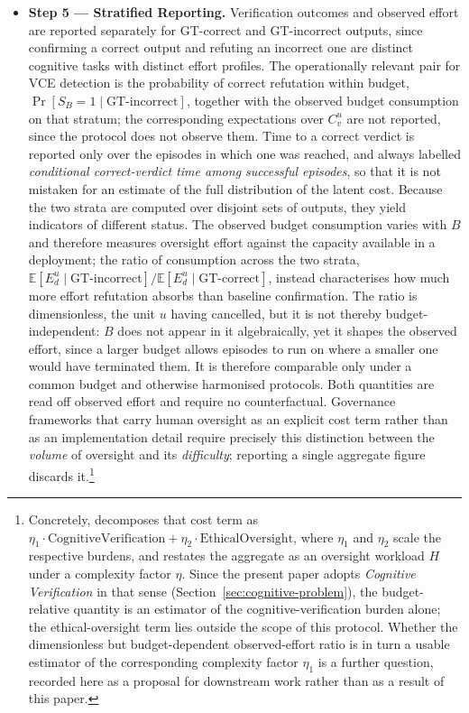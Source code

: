 \documentclass[11pt]{article}
\newcommand{\bridge}[1]{\textcolor[HTML]{ED7D31}{#1}}
\newcommand{\viola}[1]{\textcolor[HTML]{7030A0}{#1}}
\newcommand{\bridge}[1]{#1}
\newcommand{\viola}[1]{#1}
\begin{document}
\begin{itemize}
    \item \textbf{Step 5 --- Stratified Reporting.} \viola{Verification outcomes and observed effort are reported separately for GT-correct and GT-incorrect outputs, since confirming a correct output and refuting an incorrect one are distinct cognitive tasks with distinct effort profiles.} \viola{The operationally relevant pair for VCE detection is the probability of correct refutation within budget, \mbox{$\Pr[S_B=1 \mid \text{GT-incorrect}]$}, together with the observed budget consumption on that stratum; the corresponding expectations over \mbox{$C_v^{u}$} are not reported, since the protocol does not observe them. \viola{Time to a correct verdict is reported only over the episodes in which one was reached, and always labelled \emph{conditional correct-verdict time among successful episodes}, so that it is not mistaken for an estimate of the full distribution of the latent cost.}}
    \bridge{Because the two strata are computed over disjoint sets of outputs, they yield indicators of different status.} \viola{The observed budget consumption varies with $B$ and therefore measures oversight effort against the capacity available in a deployment; the ratio of consumption across the two strata, \mbox{$\mathbb{E}[E_d^u \mid \text{GT-incorrect}]/\mathbb{E}[E_d^u \mid \text{GT-correct}]$}, instead characterises how much more effort refutation absorbs than baseline confirmation. The ratio is dimensionless, the unit $u$ having cancelled, but it is not thereby budget-independent: $B$ does not appear in it algebraically, yet it shapes the \viola{observed effort}, since a larger budget allows episodes to run on where a smaller one would have terminated them. It is therefore comparable only under a common budget and otherwise harmonised protocols. \viola{Both quantities are read off observed effort and require no counterfactual.}} \bridge{ Governance frameworks that carry human oversight as an explicit cost term rather than as an implementation detail \citep{Immediato2026-IJSC} require precisely this distinction between the \emph{volume} of oversight and its \emph{difficulty}; reporting a single aggregate figure discards it.\footnote{\bridge{Concretely, \citet{Immediato2025-POM} decomposes that cost term as $\eta_1 \cdot \text{CognitiveVerification} + \eta_2 \cdot \text{EthicalOversight}$, where $\eta_1$ and $\eta_2$ scale the respective burdens, and \citet{Immediato2026-IJSC} restates the aggregate as an oversight workload $H$ under a complexity factor $\eta$. Since the present paper adopts \emph{Cognitive Verification} in that sense (Section~\ref{sec:cognitive-problem}), the budget-relative quantity is an estimator of the cognitive-verification burden alone; the ethical-oversight term lies outside the scope of this protocol. Whether the \viola{dimensionless but budget-dependent observed-effort} ratio is in turn a usable estimator of the corresponding complexity factor $\eta_1$ is a further question, recorded here as a proposal for downstream work rather than as a result of this paper.}}}


\end{itemize}
\end{document}
